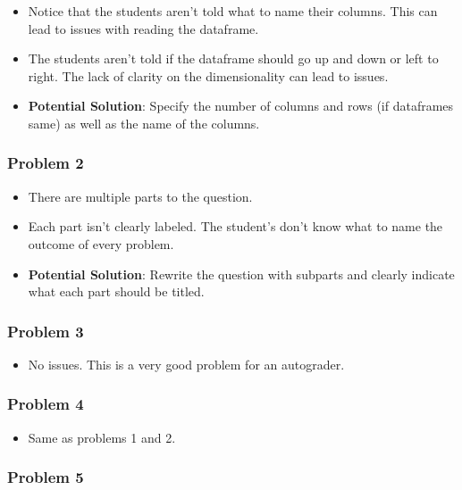 \documentclass[
]{article}
\providecommand{\tightlist}{%
  \setlength{\itemsep}{0pt}\setlength{\parskip}{0pt}}
\begin{document}
\begin{itemize}
\item
  Notice that the students aren't told what to name their columns. This
  can lead to issues with reading the dataframe.
\item
  The students aren't told if the dataframe should go up and down or
  left to right. The lack of clarity on the dimensionality can lead to
  issues.
\item
  \textbf{Potential Solution}: Specify the number of columns and rows
  (if dataframes same) as well as the name of the columns.
\end{itemize}

\hypertarget{problem-2}{%
\subsubsection{Problem 2}\label{problem-2}}

\begin{itemize}
\item
  There are multiple parts to the question.
\item
  Each part isn't clearly labeled. The student's don't know what to name
  the outcome of every problem.
\item
  \textbf{Potential Solution}: Rewrite the question with subparts and
  clearly indicate what each part should be titled.
\end{itemize}

\hypertarget{problem-3}{%
\subsubsection{Problem 3}\label{problem-3}}

\begin{itemize}
\tightlist
\item
  No issues. This is a very good problem for an autograder.
\end{itemize}

\hypertarget{problem-4}{%
\subsubsection{Problem 4}\label{problem-4}}

\begin{itemize}
\tightlist
\item
  Same as problems 1 and 2.
\end{itemize}

\hypertarget{problem-5}{%
\subsubsection{Problem 5}\label{problem-5}}
\end{document}
